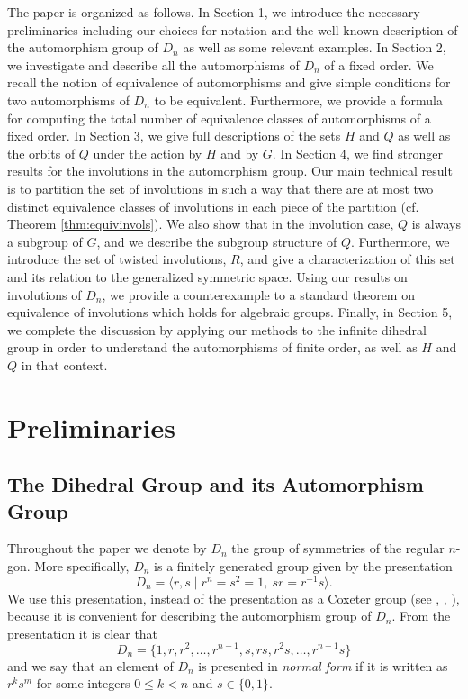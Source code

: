 \documentclass[12pt]{amsart}
\numberwithin{equation}{section}
\theoremstyle{definition}
\begin{document}
The paper is organized as follows.
In Section 1, we introduce the necessary preliminaries including our choices for notation and the
well known description of the automorphism group of $D_n$ as well as
some relevant examples. In Section 2, we investigate
and describe all the automorphisms of $D_n$ of a fixed order. We recall the notion
of equivalence of automorphisms and give simple
conditions for two automorphisms of $D_n$ to be equivalent. Furthermore, we provide a formula for computing the total number of equivalence classes of automorphisms of a fixed order. In Section
3, we give full descriptions of the sets $H$ and $Q$ as well as the orbits of $Q$ under
the action by $H$ and by $G$. In Section 4, we find stronger results for the involutions in the automorphism group. Our main technical result is to partition the set of involutions in such a way that there are at most two distinct equivalence classes of involutions in each piece of the partition (cf. Theorem \ref{thm:equivinvols}). We also show that in the involution case, $Q$ is always a subgroup of $G$, and we describe the subgroup structure of $Q$. Furthermore, we introduce the set of twisted involutions, $R$, and give a characterization of this set and its relation to the generalized symmetric space. Using our results on involutions of $D_n$, we provide a counterexample to
a standard theorem on equivalence of involutions which holds for
algebraic groups. Finally, in Section 5, we complete the discussion by applying our methods to the infinite dihedral group in order to understand the automorphisms of finite order, as well as $H$ and $Q$ in that context.

\section{Preliminaries}

\subsection{The Dihedral Group and its Automorphism Group}
Throughout the paper we denote by $D_n$ the group of symmetries of the
regular $n$-gon. More specifically, $D_n$ is a finitely generated
group given by the presentation
$$D_n=\langle r,s\mid r^n=s^2=1,\ sr=r^{-1}s\rangle.$$
We use this presentation, instead of the presentation as a Coxeter
group (see \cite[Example 1.2.7]{Bjorner},
\cite[\S1.1, \S4.2]{Humphreys}, \cite[\S1.2]{Bourbaki}), because it is convenient for describing
the automorphism group of $D_n$. From the presentation it is clear
that
\[ D_n = \{ 1, r, r^2, \ldots, r^{n-1}, s, rs, r^2s, \ldots, r^{n-1}s
\} \]
and we say that an element of $D_n$ is presented in \emph{normal form}
if it is written as $r^ks^m$ for some integers $0 \le k < n$ and $s
\in \{0, 1\}$.
\end{document}
